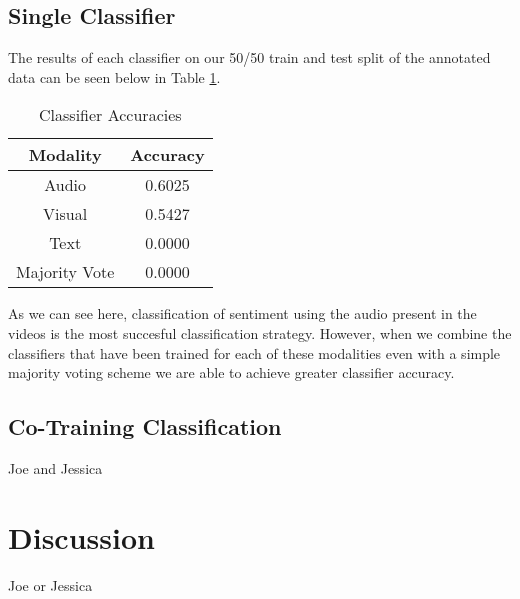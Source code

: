\documentclass[twoside]{article}
\begin{document}
\begin{multicols}{2}
\subsection{Single Classifier}
The results of each classifier on our 50/50 train and test split of the annotated data can be seen below in Table \ref{tab:SingleResults}.

\begin{table}[H]
\centering
\caption{Classifier Accuracies}
\label{tab:SingleResults}
\begin{tabular}{| c | c |} 
\hline
 Modality & Accuracy \\ \hline \hline
Audio & 0.6025 \\ \hline
Visual & 0.5427 \\ \hline
Text & {\color{red}0.0000} \\ \hline
Majority Vote & {\color{red}0.0000} \\ \hline
\end{tabular}
\end{table}

As we can see here, classification of sentiment using the audio present in the videos is the most succesful classification strategy.
However, when we combine the classifiers that have been trained for each of these modalities even with a simple majority voting scheme we are able to achieve greater classifier accuracy.

\subsection{Co-Training Classification}
Joe and Jessica


\section{Discussion}
Joe or Jessica



{}



\end{multicols}
\end{document}
